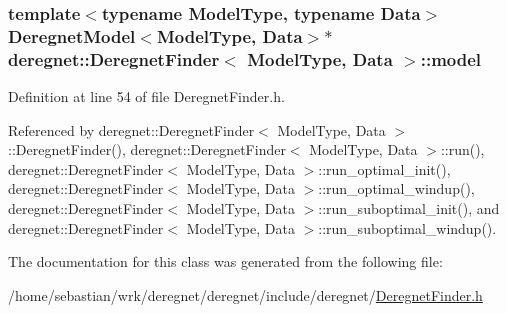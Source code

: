 \subsubsection[{\texorpdfstring{model}{model}}]{\setlength{\rightskip}{0pt plus 5cm}template$<$typename Model\+Type, typename Data$>$ {\bf Deregnet\+Model}$<$Model\+Type, {\bf Data}$>$$\ast$ {\bf deregnet\+::\+Deregnet\+Finder}$<$ Model\+Type, {\bf Data} $>$\+::model\hspace{0.3cm}{\ttfamily [private]}}\hypertarget{classderegnet_1_1DeregnetFinder_ad922d8e38124b4c75daac29a928fcf5b}{}\label{classderegnet_1_1DeregnetFinder_ad922d8e38124b4c75daac29a928fcf5b}


Definition at line 54 of file Deregnet\+Finder.\+h.



Referenced by deregnet\+::\+Deregnet\+Finder$<$ Model\+Type, Data $>$\+::\+Deregnet\+Finder(), deregnet\+::\+Deregnet\+Finder$<$ Model\+Type, Data $>$\+::run(), deregnet\+::\+Deregnet\+Finder$<$ Model\+Type, Data $>$\+::run\+\_\+optimal\+\_\+init(), deregnet\+::\+Deregnet\+Finder$<$ Model\+Type, Data $>$\+::run\+\_\+optimal\+\_\+windup(), deregnet\+::\+Deregnet\+Finder$<$ Model\+Type, Data $>$\+::run\+\_\+suboptimal\+\_\+init(), and deregnet\+::\+Deregnet\+Finder$<$ Model\+Type, Data $>$\+::run\+\_\+suboptimal\+\_\+windup().



The documentation for this class was generated from the following file\+:\begin{DoxyCompactItemize}
\item 
/home/sebastian/wrk/deregnet/deregnet/include/deregnet/\hyperlink{DeregnetFinder_8h}{Deregnet\+Finder.\+h}\end{DoxyCompactItemize}

